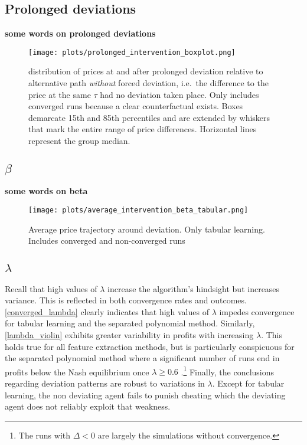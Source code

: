 \subsection{Prolonged deviations}\label{prolonged_deviations_appendix}

	\textbf{some words on prolonged deviations}
	
\begin{figure}
		\texttt{[image: plots/prolonged\_intervention\_boxplot.png]}
		\caption{distribution of prices at and after prolonged deviation relative to alternative path \emph{without} forced deviation, i.e.\ the difference to the price at the same $\tau$ had no deviation taken place. Only includes converged runs because a clear counterfactual exists. Boxes demarcate 15th and 85th percentiles and are extended by whiskers that mark the entire range of price differences. Horizontal lines represent the group median.}
		\label{prolonged_intervention_boxplot}
\end{figure}


\pagebreak
\subsection{$\beta$}\label{beta_appendix}

\textbf{some words on beta}

\begin{figure}
	\texttt{[image: plots/average\_intervention\_beta\_tabular.png]}
	\caption{Average price trajectory around deviation. Only tabular learning. Includes converged and non-converged runs}
	\label{average_intervention_beta_tabular}
\end{figure}


\pagebreak
\subsection{$\lambda$}\label{lambda_appendix}


Recall that high values of $\lambda$ increase the algorithm's hindsight but increases variance. This is reflected in both convergence rates and outcomes. \autoref{converged_lambda} clearly indicates that high values of $\lambda$ impedes convergence for tabular learning and the separated polynomial method. Similarly, \autoref{lambda_violin} exhibits greater variability in profits with increasing $\lambda$. This holds true for all feature extraction methods, but is particularly conspicuous for the separated polynomial method where a significant number of runs end in profits below the Nash equilibrium once $\lambda \ge 0.6$ .\footnote{The runs with $\Delta <0$ are largely the simulations without convergence.} Finally, the conclusions regarding deviation patterns are robust to variations in $\lambda$. Except for tabular learning, the non deviating agent fails to punish cheating which the deviating agent does not reliably exploit that weakness.

